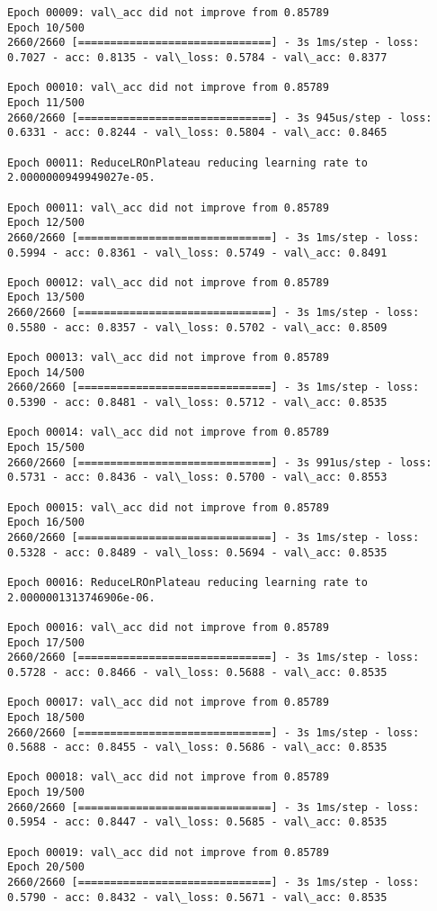\documentclass[11pt]{article}
\begin{document}
\begin{Verbatim}[commandchars=\\\{\}]
Epoch 00009: val\_acc did not improve from 0.85789
Epoch 10/500
2660/2660 [==============================] - 3s 1ms/step - loss: 0.7027 - acc: 0.8135 - val\_loss: 0.5784 - val\_acc: 0.8377

Epoch 00010: val\_acc did not improve from 0.85789
Epoch 11/500
2660/2660 [==============================] - 3s 945us/step - loss: 0.6331 - acc: 0.8244 - val\_loss: 0.5804 - val\_acc: 0.8465

Epoch 00011: ReduceLROnPlateau reducing learning rate to 2.0000000949949027e-05.

Epoch 00011: val\_acc did not improve from 0.85789
Epoch 12/500
2660/2660 [==============================] - 3s 1ms/step - loss: 0.5994 - acc: 0.8361 - val\_loss: 0.5749 - val\_acc: 0.8491

Epoch 00012: val\_acc did not improve from 0.85789
Epoch 13/500
2660/2660 [==============================] - 3s 1ms/step - loss: 0.5580 - acc: 0.8357 - val\_loss: 0.5702 - val\_acc: 0.8509

Epoch 00013: val\_acc did not improve from 0.85789
Epoch 14/500
2660/2660 [==============================] - 3s 1ms/step - loss: 0.5390 - acc: 0.8481 - val\_loss: 0.5712 - val\_acc: 0.8535

Epoch 00014: val\_acc did not improve from 0.85789
Epoch 15/500
2660/2660 [==============================] - 3s 991us/step - loss: 0.5731 - acc: 0.8436 - val\_loss: 0.5700 - val\_acc: 0.8553

Epoch 00015: val\_acc did not improve from 0.85789
Epoch 16/500
2660/2660 [==============================] - 3s 1ms/step - loss: 0.5328 - acc: 0.8489 - val\_loss: 0.5694 - val\_acc: 0.8535

Epoch 00016: ReduceLROnPlateau reducing learning rate to 2.0000001313746906e-06.

Epoch 00016: val\_acc did not improve from 0.85789
Epoch 17/500
2660/2660 [==============================] - 3s 1ms/step - loss: 0.5728 - acc: 0.8466 - val\_loss: 0.5688 - val\_acc: 0.8535

Epoch 00017: val\_acc did not improve from 0.85789
Epoch 18/500
2660/2660 [==============================] - 3s 1ms/step - loss: 0.5688 - acc: 0.8455 - val\_loss: 0.5686 - val\_acc: 0.8535

Epoch 00018: val\_acc did not improve from 0.85789
Epoch 19/500
2660/2660 [==============================] - 3s 1ms/step - loss: 0.5954 - acc: 0.8447 - val\_loss: 0.5685 - val\_acc: 0.8535

Epoch 00019: val\_acc did not improve from 0.85789
Epoch 20/500
2660/2660 [==============================] - 3s 1ms/step - loss: 0.5790 - acc: 0.8432 - val\_loss: 0.5671 - val\_acc: 0.8535


\end{Verbatim}
\end{document}
